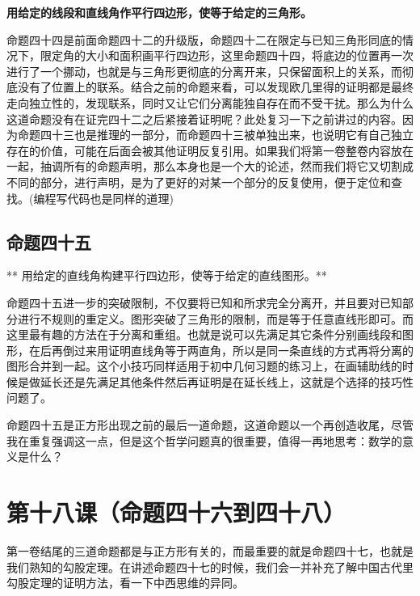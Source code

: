 \documentclass[
]{book}
\begin{document}
\textbf{用给定的线段和直线角作平行四边形，使等于给定的三角形。}

命题四十四是前面命题四十二的升级版，命题四十二在限定与已知三角形同底的情况下，限定角的大小和面积画平行四边形，这里命题四十四，将底边的位置再一次进行了一个挪动，也就是与三角形更彻底的分离开来，只保留面积上的关系，而彻底没有了位置上的联系。结合之前的命题来看，可以发现欧几里得的证明都是最终走向独立性的，发现联系，同时又让它们分离能独自存在而不受干扰。那么为什么这道命题没有在证完四十二之后紧接着证明呢？此处复习一下之前讲过的内容。因为命题四十三也是推理的一部分，而命题四十三被单独出来，也说明它有自己独立存在的价值，可能在后面会被其他证明反复引用。如果我们将第一卷整卷内容放在一起，抽调所有的命题声明，那么本身也是一个大的论述，然而我们将它又切割成不同的部分，进行声明，是为了更好的对某一个部分的反复使用，便于定位和查找。(编程写代码也是同样的道理)

\hypertarget{ux547dux9898ux56dbux5341ux4e94}{%
\section{命题四十五}\label{ux547dux9898ux56dbux5341ux4e94}}

** 用给定的直线角构建平行四边形，使等于给定的直线图形。**

命题四十五进一步的突破限制，不仅要将已知和所求完全分离开，并且要对已知部分进行不规则的重定义。图形突破了三角形的限制，而是等于任意直线形即可。而这里最有趣的方法在于分离和重组。也就是说可以先满足其它条件分别画线段和图形，在后再倒过来用证明直线角等于两直角，所以是同一条直线的方式再将分离的图形合并到一起。这个小技巧同样适用于初中几何习题的练习上，在画辅助线的时候是做延长还是先满足其他条件然后再证明是在延长线上，这就是个选择的技巧性问题了。

命题四十五是正方形出现之前的最后一道命题，这道命题以一个再创造收尾，尽管我在重复强调这一点，但是这个哲学问题真的很重要，值得一再地思考：数学的意义是什么？

\hypertarget{ux7b2cux5341ux516bux8bfeux547dux9898ux56dbux5341ux516dux5230ux56dbux5341ux516b}{%
\chapter{第十八课（命题四十六到四十八）}\label{ux7b2cux5341ux516bux8bfeux547dux9898ux56dbux5341ux516dux5230ux56dbux5341ux516b}}

第一卷结尾的三道命题都是与正方形有关的，而最重要的就是命题四十七，也就是我们熟知的勾股定理。在讲述命题四十七的时候，我们会一并补充了解中国古代里勾股定理的证明方法，看一下中西思维的异同。
\end{document}
